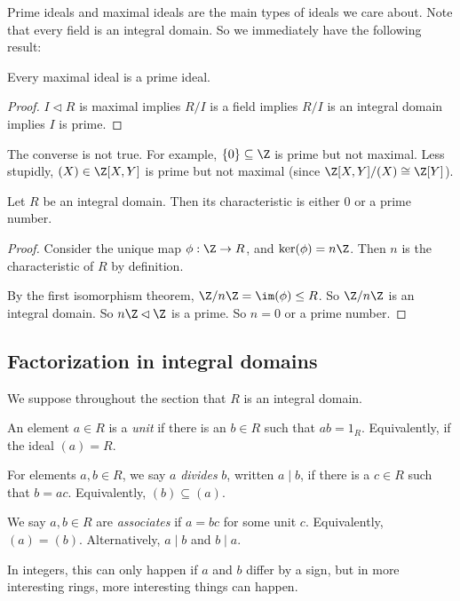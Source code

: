 \documentclass[a4paper]{article}
\begin{document}
Prime ideals and maximal ideals are the main types of ideals we care about. Note that every field is an integral domain. So we immediately have the following result:
\begin{prop}
  Every maximal ideal is a prime ideal.
\end{prop}

\begin{proof}
  $I \lhd R$ is maximal implies $R/I$ is a field implies $R/I$ is an integral domain implies $I$ is prime.
\end{proof}
The converse is not true. For example, $\{0\} \subseteq \Z$ is prime but not maximal. Less stupidly, $(X) \in \Z[X, Y]$ is prime but not maximal (since $\Z[X, Y]/(X) \cong \Z[Y]$).

\begin{lemma}
  Let $R$ be an integral domain. Then its characteristic is either $0$ or a prime number.
\end{lemma}

\begin{proof}
  Consider the unique map $\phi: \Z \to R$, and $\ker(\phi) = n\Z$. Then $n$ is the characteristic of $R$ by definition.

  By the first isomorphism theorem, $\Z/n\Z = \im(\phi) \leq R$. So $\Z/n\Z$ is an integral domain. So $n\Z \lhd \Z$ is a prime. So $n = 0$ or a prime number.
\end{proof}

\subsection{Factorization in integral domains}
We suppose throughout the section that $R$ is an integral domain.

\begin{defi}[Unit]
  An element $a \in R$ is a \emph{unit} if there is an $b \in R$ such that $ab = 1_R$. Equivalently, if the ideal $(a) = R$.
\end{defi}

\begin{defi}[Division]
  For elements $a, b \in R$, we say $a$ \emph{divides} $b$, written $a \mid b$, if there is a $c \in R$ such that $b = ac$. Equivalently, $(b) \subseteq (a)$.
\end{defi}

\begin{defi}[Associates]
  We say $a, b \in R$ are \emph{associates} if $a = bc$ for some unit $c$. Equivalently, $(a) = (b)$. Alternatively, $a \mid b$ and $b \mid a$.
\end{defi}
In integers, this can only happen if $a$ and $b$ differ by a sign, but in more interesting rings, more interesting things can happen.
\end{document}
